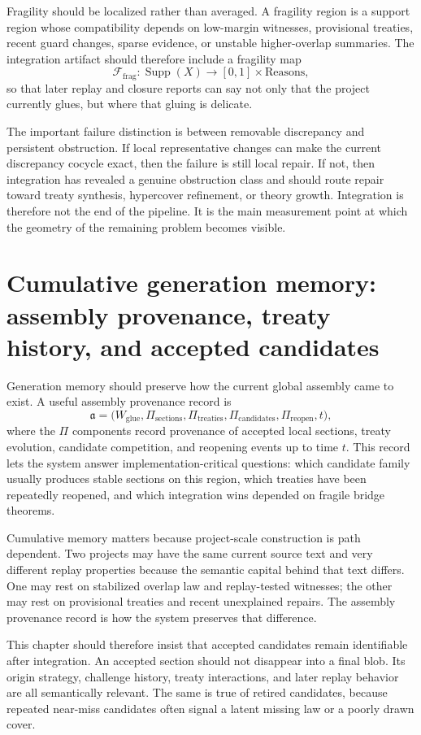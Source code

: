 \documentclass[11pt]{report}
\begin{document}
Fragility should be localized rather than averaged. A fragility region is a support region whose compatibility depends on low-margin witnesses, provisional treaties, recent guard changes, sparse evidence, or unstable higher-overlap summaries. The integration artifact should therefore include a fragility map
\[
\mathcal{F}_{\mathrm{frag}} : \operatorname{Supp}(X) \to [0,1] \times \mathrm{Reasons},
\]
so that later replay and closure reports can say not only that the project currently glues, but where that gluing is delicate.

The important failure distinction is between removable discrepancy and persistent obstruction. If local representative changes can make the current discrepancy cocycle exact, then the failure is still local repair. If not, then integration has revealed a genuine obstruction class and should route repair toward treaty synthesis, hypercover refinement, or theory growth. Integration is therefore not the end of the pipeline. It is the main measurement point at which the geometry of the remaining problem becomes visible.

\section{Cumulative generation memory: assembly provenance, treaty history, and accepted candidates}
Generation memory should preserve how the current global assembly came to exist. A useful assembly provenance record is
\[
\mathfrak{a}
=
\bigl(
W_{\mathrm{glue}},
\Pi_{\mathrm{sections}},
\Pi_{\mathrm{treaties}},
\Pi_{\mathrm{candidates}},
\Pi_{\mathrm{reopen}},
t
\bigr),
\]
where the $\Pi$ components record provenance of accepted local sections, treaty evolution, candidate competition, and reopening events up to time $t$. This record lets the system answer implementation-critical questions: which candidate family usually produces stable sections on this region, which treaties have been repeatedly reopened, and which integration wins depended on fragile bridge theorems.

Cumulative memory matters because project-scale construction is path dependent. Two projects may have the same current source text and very different replay properties because the semantic capital behind that text differs. One may rest on stabilized overlap law and replay-tested witnesses; the other may rest on provisional treaties and recent unexplained repairs. The assembly provenance record is how the system preserves that difference.

This chapter should therefore insist that accepted candidates remain identifiable after integration. An accepted section should not disappear into a final blob. Its origin strategy, challenge history, treaty interactions, and later replay behavior are all semantically relevant. The same is true of retired candidates, because repeated near-miss candidates often signal a latent missing law or a poorly drawn cover.
\end{document}
